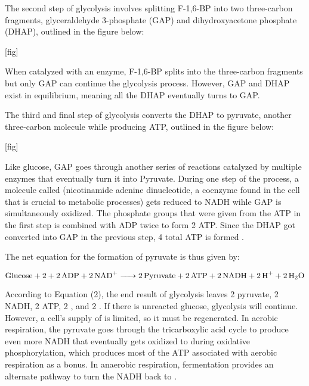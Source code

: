 \documentclass[12pt]{article}
\begin{document}
\medskip

The second step of glycolysis involves splitting F-1,6-BP into two three-carbon fragments, glyceraldehyde 3-phosphate (GAP) and dihydroxyacetone phosphate (DHAP), outlined in the figure below:

\medskip

[fig]

\medskip

When catalyzed with an enzyme, F-1,6-BP splits into the three-carbon fragments but only GAP can continue the glycolysis process. However, GAP and DHAP exist in equilibrium, meaning all the DHAP eventually turns to GAP.

\medskip

The third and final step of glycolysis converts the DHAP to pyruvate, another three-carbon molecule while producing ATP, outlined in the figure below:

\medskip

[fig]

\medskip

Like glucose, GAP goes through another series of reactions catalyzed by multiple enzymes that eventually turn it into Pyruvate. During one step of the process, a molecule called  (nicotinamide adenine dinucleotide, a coenzyme found in the cell that is crucial to metabolic processes) \parencite{ref} gets reduced to NADH wihle GAP is simultaneously oxidized. The phosphate groups that were given from the ATP in the first step is combined with ADP twice to form 2 ATP. Since the DHAP got converted into GAP in the previous step, 4 total ATP is formed \parencite{ref}.

\medskip

The net equation for the formation of pyruvate is thus given by:

\medskip

\begin{equation}
    \ce{Glucose + 2 + 2ADP + 2NAD+ -> 2Pyruvate + 2ATP + 2 NADH + 2H+ + 2H2O}
\end{equation}

\medskip

According to Equation (2), the end result of glycolysis leaves 2 pyruvate, 2 NADH, 2 ATP, 2 , and 2 . If there is unreacted glucose, glycolysis will continue. However, a cell's supply of  is limited, so it must be regenerated. In aerobic respiration, the pyruvate goes through the tricarboxylic acid cycle to produce even more NADH that eventually gets oxidized to  during oxidative phosphorylation, which produces most of the ATP associated with aerobic respiration as a bonus. In anaerobic respiration, fermentation provides an alternate pathway to turn the NADH back to .
\end{document}
